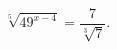 \begin{ex}[type=equation]
	\begin{condition}
		$\sqrt[5]{49^{x - 4}} = \dfrac{7}{\sqrt[3]{7}}.$
	\end{condition}
\end{ex}